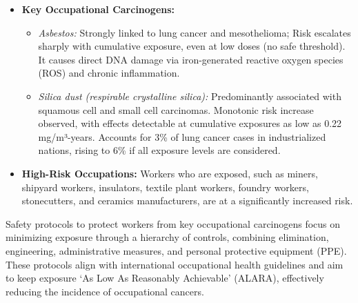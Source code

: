 \begin{itemize}
    \item \textbf{Key Occupational Carcinogens:}
    \begin{itemize}
        \item \textit{Asbestos:} Strongly linked to lung cancer and mesothelioma; Risk escalates 
        sharply with cumulative exposure, even at low doses (no safe threshold). It causes direct 
        DNA damage via iron-generated reactive oxygen species (ROS) and chronic inflammation. 
        \cite{9498906}

        \item \textit{Silica dust (respirable crystalline silica):} Predominantly associated with 
        squamous cell and small cell carcinomas. Monotonic risk increase observed, with effects 
        detectable at cumulative exposures as low as 0.22 mg/m³-years. Accounts for 3\% of lung 
        cancer cases in industrialized nations, rising to 6\% \cite{CEBP2010} if all exposure levels 
        are considered.
    \end{itemize}

    \item \textbf{High-Risk Occupations:} Workers who are exposed, such as miners, shipyard 
    workers, insulators, textile plant workers, foundry workers, stonecutters, and ceramics 
    manufacturers, are at a significantly increased risk. 
\end{itemize}

Safety protocols to protect workers from key occupational carcinogens focus on minimizing exposure 
through a hierarchy of controls, combining elimination, engineering, administrative measures, and 
personal protective equipment (PPE). These protocols align with international occupational health 
guidelines and aim to keep exposure `As Low As Reasonably Achievable' (ALARA), effectively reducing 
the incidence of occupational cancers.
